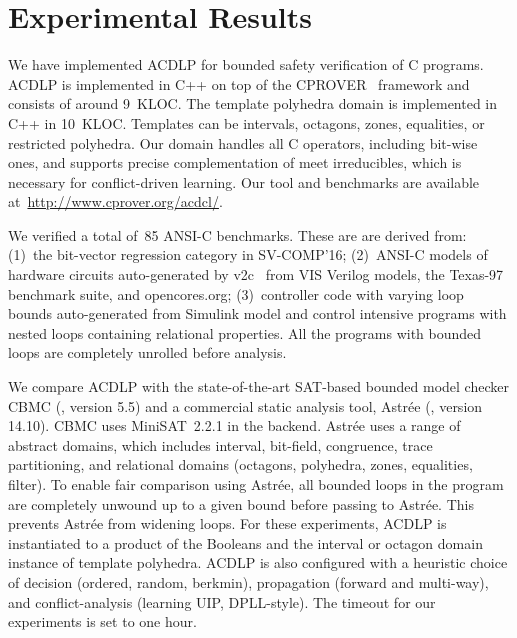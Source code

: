 \section{Experimental Results}
%
We have implemented ACDLP for bounded safety verification of C programs.  
ACDLP is implemented in C++ on top of the
\textsc{CPROVER}~\cite{cprover} framework and consists of around 9~KLOC. 
The template polyhedra domain is implemented in C++ in 10~KLOC.  Templates
can be intervals, octagons, zones, equalities, or restricted polyhedra.  Our
domain handles all C operators, including bit-wise ones, and supports
precise complementation of meet irreducibles, which is necessary for
conflict-driven learning.  Our tool and benchmarks are available 
at~\url{http://www.cprover.org/acdcl/}.
%


We verified a total of~85 ANSI-C benchmarks.  These are are derived from:
(1)~the bit-vector regression category in SV-COMP'16; (2)~ANSI-C models of
hardware circuits auto-generated by v2c~\cite{mtk2016} from VIS Verilog
models, the Texas-97 benchmark suite, and opencores.org; (3)~controller 
code with varying loop bounds auto-generated from Simulink model and control 
intensive programs with nested loops containing relational properties. 
All the programs with bounded loops are completely unrolled before
analysis.

We compare ACDLP with the state-of-the-art SAT-based bounded model checker
CBMC (\cite{cbmc}, version 5.5) and a commercial static analysis tool,
Astr{\'e}e (\cite{astree}, version 14.10).  CBMC uses MiniSAT~2.2.1 in the
backend.  Astr{\'e}e uses a range of abstract domains, which includes
interval, bit-field, congruence, trace partitioning, and relational domains
(octagons, polyhedra, zones, equalities, filter).  To enable fair comparison
using Astr{\'e}e, all bounded loops in the program are completely unwound up
to a given bound before passing to Astr{\'e}e.  This prevents Astr{\'e}e
from widening loops.
%
For these experiments, ACDLP is instantiated to a product of the Booleans
and the interval or octagon domain instance of template polyhedra.  ACDLP is
also configured with a heuristic choice of decision (ordered, random, berkmin), 
propagation (forward and multi-way), and conflict-analysis (learning UIP, 
DPLL-style).  The timeout for our experiments is set to one hour.  
%

